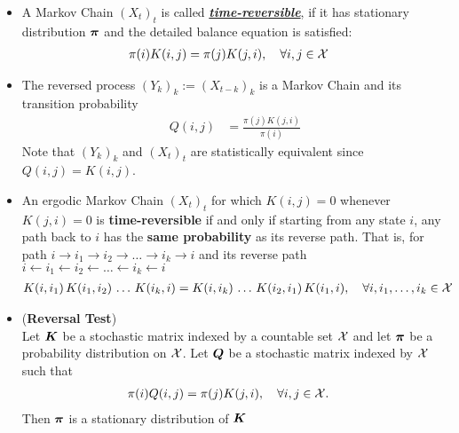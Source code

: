 \documentclass[11pt]{article}
\begin{document}
\begin{itemize}
\item \begin{definition}
A Markov Chain $(X_t)_t$ is called \underline{\emph{\textbf{time-reversible}}}, if it has stationary distribution $\boldsymbol{\pi}$ and the detailed balance equation is satisfied:
\begin{align}
\pi(i)K(i, j) &=  \pi(j)K(j, i),\quad \forall i, j\in {\mathcal X}  \label{eqn: mc_detailed_balance_eqn_time_rev}
\end{align}
\end{definition}

\item The reversed process $(Y_{k})_k := (X_{t-k})_{k}$ is a Markov Chain and its transition probability 
\begin{align}
Q(i,j) &= \frac{\pi(j)K(j,i)}{\pi(i)} \label{eqn: mc_rev_kernel}
\end{align} Note that $(Y_{k})_k$ and $(X_t)_t$ are statistically equivalent since $Q(i,j) = K(i,j)$.

\item 
\begin{theorem}
An ergodic Markov Chain $(X_t)_t$ for which $K(i,j) =0$ whenever $K(j, i) = 0$ is \textbf{time-reversible} if and only if starting from any state $i$, any path back to $i$ has the \textbf{same probability} as its reverse path. That is, for path $i \rightarrow i_1\rightarrow i_2 \rightarrow \ldots \rightarrow i_k \rightarrow i$ and its reverse path $i \leftarrow i_1 \leftarrow i_2 \leftarrow \ldots  \leftarrow i_k \leftarrow i$
\begin{align}
K(i, i_1)\,K(i_1, i_2)\,\ldots\,K(i_k, i) &= K(i, i_k)\,\ldots\,K(i_2, i_{1})\,K(i_1, i), \quad \forall i,i_1,\ldots, i_k\in {\mathcal X} \label{eqn: mc_path_rev}
\end{align} 
\end{theorem}

\item 
\begin{theorem} (\textbf{Reversal Test})\\
Let $\boldsymbol{K}$ be a stochastic matrix indexed by a countable set ${\mathcal X}$ and let $\boldsymbol{\pi}$ be a probability distribution on ${\mathcal X}$. Let $\boldsymbol{Q}$ be a stochastic matrix indexed by ${\mathcal X}$ such that
\begin{align}
\pi(i)Q(i, j) &=  \pi(j)K(j, i),\quad \forall i, j\in {\mathcal X}.  \label{eqn: mc_time_rev_test}
\end{align}  Then $\boldsymbol{\pi}$ is a stationary distribution of $\boldsymbol{K}$
\end{theorem}


\end{itemize}
\end{document}
